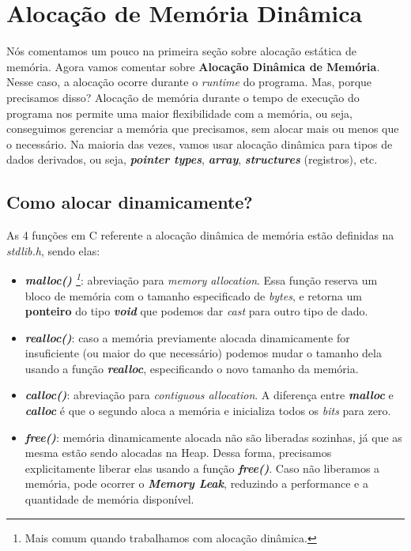 \section{Alocação de Memória Dinâmica}
Nós comentamos um pouco na primeira seção sobre alocação estática de memória. Agora vamos comentar sobre
\textbf{Alocação Dinâmica de Memória}. Nesse caso, a alocação ocorre durante o \textit{runtime} do programa.
Mas, porque precisamos disso? Alocação de memória durante o tempo de execução do programa nos permite uma maior
flexibilidade com a memória, ou seja, conseguimos gerenciar a memória que precisamos, sem alocar mais
ou menos que o necessário. Na maioria das vezes, vamos usar alocação dinâmica para tipos de dados
derivados, ou seja, \textbf{\textit{pointer types}}, \textbf{\textit{array}}, \textbf{\textit{structures}} (registros), etc.

\subsection{Como alocar dinamicamente?}
As 4 funções em C referente a alocação dinâmica de memória estão definidas na \textit{stdlib.h}, sendo elas:
\begin{itemize}
  \item \textit{\textbf{malloc()} \footnote{Mais comum quando trabalhamos com alocação dinâmica.}}: abreviação para \textit{memory allocation}. Essa função reserva um bloco de memória
    com o tamanho especificado de \textit{bytes}, e retorna um \textbf{ponteiro} do tipo \textbf{\textit{void}}
    que podemos dar \textit{cast} para outro tipo de dado. 
  \item \textbf{\textit{realloc()}}: caso a memória previamente alocada dinamicamente for insuficiente (ou maior do que necessário)
    podemos mudar o tamanho dela usando a função \textbf{\textit{realloc}}, especificando o novo tamanho da memória.
  \item \textbf{\textit{calloc()}}: abreviação para \textit{contiguous allocation}. A diferença entre \textbf{\textit{malloc}} e \textbf{\textit{calloc}}
    é que o segundo aloca a memória e inicializa todos os \textit{bits} para zero.
  \item \textbf{\textit{free()}}: memória dinamicamente alocada não são liberadas sozinhas, já que as mesma
    estão sendo alocadas na Heap. Dessa forma, precisamos explicitamente liberar elas usando a função \textbf{\textit{free()}}.
    Caso não liberamos a memória, pode ocorrer o \textbf{\textit{Memory Leak}}, reduzindo a performance e a
    quantidade de memória disponível.
\end{itemize}

